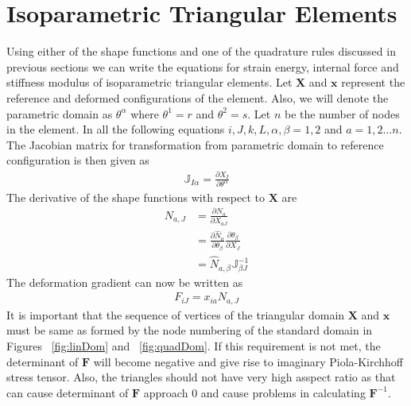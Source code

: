 \documentclass[../main.tex]{subfiles}
\begin{document}
\section*{Isoparametric Triangular Elements}
Using either of the shape functions and one of the quadrature rules
discussed in previous sections we can write the equations for strain
energy, internal force and stiffness modulus of isoparametric
triangular elements.  Let $\mathbf{X}$ and $\mathbf{x}$ represent the
reference and deformed configurations of the element. Also, we will
denote the parametric domain as $\theta^\alpha$ where $\theta^1 = r$
and $\theta^2=s$. Let $n$ be the number of nodes in the element. In
all the following equations $i,J,k,L,\alpha,\beta = 1,2$ and
$a=1,2\ldots n$. The Jacobian matrix for transformation from
parametric domain to reference configuration is then given as
\begin{align*}
  \mathbb{J}_{I\alpha} = \frac{\partial X_{I}}{\partial\theta^{\alpha}}
\end{align*}
The derivative of the shape functions with respect to $\mathbf{X}$ are
\begin{align*}
  N_{a,J} &= \frac{\partial N_a}{\partial X_{aJ}}\\
          &= \frac{\partial\hat{N}_a}{\partial\theta_{\beta}}\frac{\partial\theta_{\beta}}{\partial X_{J}}\\
          &= \hat{N}_{a,\beta}\mathbb{J}^{-1}_{\beta J}
\end{align*}
The deformation gradient can now be written as
\begin{align*}
  F_{iJ} = x_{ia}N_{a,J}
\end{align*}
It is important that the sequence of vertices of the triangular domain
$\mathbf{X}$ and $\mathbf{x}$ must be same as formed by the node
numbering of the standard domain in Figures ~\ref{fig:linDom} and
~\ref{fig:quadDom}. If this requirement is not met, the determinant of
$\mathbf{F}$ will become negative and give rise to imaginary
Piola-Kirchhoff stress tensor. Also, the triangles should not have
very high asspect ratio as that can cause determinant of $\mathbf{F}$
approach $0$ and cause problems in calculating $\mathbf{F}^{-1}$.
\end{document}
